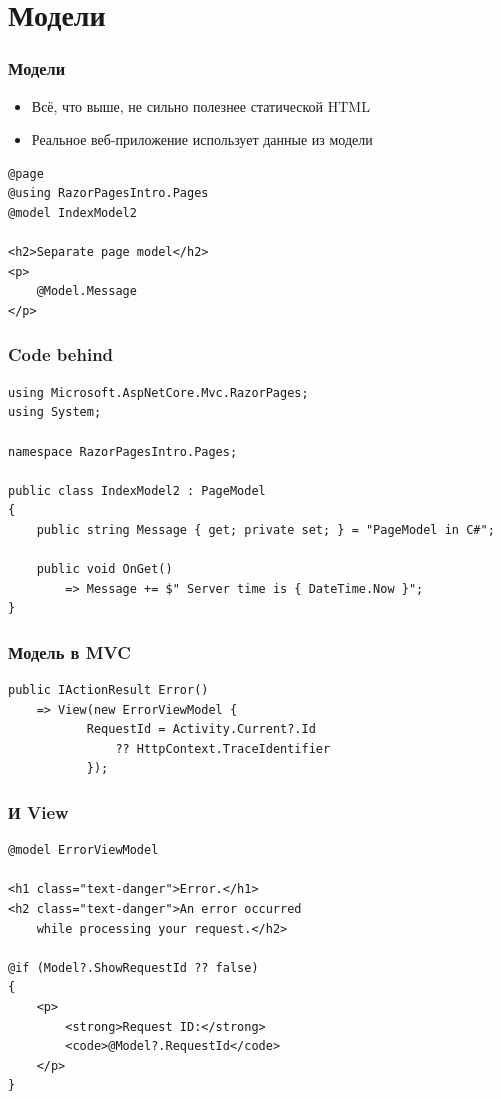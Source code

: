 \documentclass{../../slides-style}
\begin{document}
    \section{Модели}

    \begin{frame}[fragile]
        \frametitle{Модели}
        \begin{itemize}
            \item Всё, что выше, не сильно полезнее статической HTML
            \item Реальное веб-приложение использует данные из модели
        \end{itemize}
        \begin{verbatim}
@page
@using RazorPagesIntro.Pages
@model IndexModel2

<h2>Separate page model</h2>
<p>
    @Model.Message
</p>
        \end{verbatim}
    \end{frame}

    \begin{frame}[fragile]
        \frametitle{Code behind}
        \begin{small}
            \begin{verbatim}
using Microsoft.AspNetCore.Mvc.RazorPages;
using System;

namespace RazorPagesIntro.Pages;

public class IndexModel2 : PageModel
{
    public string Message { get; private set; } = "PageModel in C#";

    public void OnGet()
        => Message += $" Server time is { DateTime.Now }";
}

            \end{verbatim}
        \end{small}
    \end{frame}

    \begin{frame}[fragile]
        \frametitle{Модель в MVC}
        \begin{verbatim}
public IActionResult Error()
    => View(new ErrorViewModel { 
           RequestId = Activity.Current?.Id 
               ?? HttpContext.TraceIdentifier 
           });
        \end{verbatim}
    \end{frame}

    \begin{frame}[fragile]
        \frametitle{И View}
        \begin{verbatim}
@model ErrorViewModel

<h1 class="text-danger">Error.</h1>
<h2 class="text-danger">An error occurred 
    while processing your request.</h2>

@if (Model?.ShowRequestId ?? false)
{
    <p>
        <strong>Request ID:</strong> 
        <code>@Model?.RequestId</code>
    </p>
}
        \end{verbatim}
    \end{frame}
\end{document}
